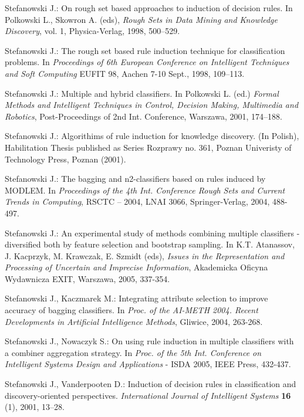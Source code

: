 \documentclass{llncs}
\begin{document}
\begin{thebibliography}{17}
  Stefanowski J.: On rough set based approaches to
induction of decision rules. In Polkowski L., Skowron A. (eds), {\em Rough
Sets in Data Mining and Knowledge Discovery}, vol. 1, Physica-Verlag, 1998,
500--529.

  Stefanowski J.: The rough set based rule induction
technique for classification problems. In {\em Proceedings of 6th European
Conference on Intelligent Techniques and Soft Computing} EUFIT 98, Aachen
7-10 Sept., 1998, 109--113.

 Stefanowski J.: Multiple and hybrid classifiers.
In Polkowski L. (ed.) {\em Formal Methods and Intelligent Techniques in
Control, Decision Making, Multimedia and Robotics}, Post-Proceedings of 2nd
Int. Conference, Warszawa, 2001, 174--188.

Stefanowski J.: Algorithims of rule induction for knowledge discovery. (In
Polish), Habilitation Thesis published as Series Rozprawy no. 361, Poznan
Univeristy of Technology Press, Poznan (2001).

Stefanowski J.: The bagging and n2-classifiers based on rules induced by
MODLEM. In {\em Proceedings of the 4th Int. Conference Rough Sets and
Current Trends in Computing}, RSCTC -- 2004, LNAI 3066, Springer-Verlag,
2004, 488-497.

 Stefanowski J.: An experimental study of methods combining multiple
classifiers - diversified both by feature selection and bootstrap sampling.
In K.T. Atanassov, J. Kacprzyk, M. Krawczak, E. Szmidt (eds), {\em Issues in
the Representation and Processing of Uncertain and Imprecise Information},
Akademicka Oficyna Wydawnicza EXIT, Warszawa, 2005, 337-354.

Stefanowski J., Kaczmarek M.: Integrating attribute selection  to improve
accuracy of bagging classifiers. In \emph{Proc. of the AI-METH 2004. Recent
Developments in Artificial Intelligence Methods},  Gliwice,  2004, 263-268.


Stefanowski J., Nowaczyk S.: On using rule induction in multiple classifiers
with a combiner aggregation strategy. In {\em Proc. of the 5th Int.
Conference on Intelligent Systems Design and Applications} - ISDA 2005, IEEE
Press, 432-437.

 Stefanowski J., Vanderpooten D.:  Induction of decision rules
in classification and discovery-oriented perspectives. \emph{International
Journal of Intelligent Systems} \textbf{16} (1), 2001, 13--28.


\end{thebibliography}
\end{document}
